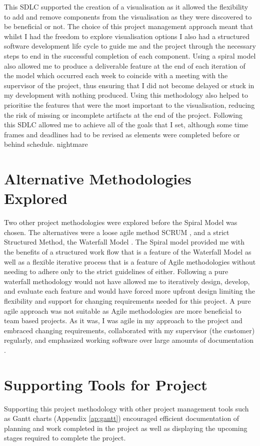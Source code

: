This SDLC supported the creation of a visualisation as
it allowed the flexibility to add and remove components from the visualisation
as they were discovered to be beneficial or not. The choice of this project management approach
meant that whilst I had the freedom to explore visualisation options I also had
a structured software development life cycle to guide me and the project through
the necessary steps to end in the successful completion of each
component.
%
Using a spiral model also allowed me to produce a deliverable feature at the end
of each iteration of the model which occurred each week to coincide with a
meeting with the supervisor of the project, thus ensuring that I did not become delayed or stuck
in my development with nothing produced. Using this methodology also
helped to prioritise the features that were the most important to the
visualisation, reducing the risk of missing or incomplete
artifacts at the end of the project. 
Following this SDLC allowed me to achieve all of the goals
that I set, although some time frames and deadlines had to be revised as elements were completed before or behind schedule. 
nightmare

\section{Alternative Methodologies Explored}
Two other project methodologies were explored before the
Spiral Model was chosen. The alternatives were a loose agile method SCRUM \cite{schwaber2004agile}, and
a strict Structured Method, the Waterfall Model \cite{royce1970managing}. 
The Spiral model provided
me with the benefits of a structured work flow that is a feature of the
Waterfall Model as
well as a flexible iterative process that is a feature of Agile methodologies
without needing to adhere only to the strict guidelines of either. Following a
pure waterfall methodology would not have allowed me to iteratively
design, develop, and evaluate each feature and would have forced more upfront
design limiting the flexibility and support for changing requirements 
needed for this project. A pure agile approach was not suitable as Agile methodologies are more
beneficial to team based projects. As it was,
I was agile in my approach to the project and embraced changing requirements,
collaborated with my supervisor (the customer) regularly, and emphasized working
software over large amounts of documentation \cite{beck2001agile}. 

\section{Supporting Tools for Project}
Supporting this project methodology with other project management tools such
as Gantt charts (Appendix \ref{ap:gantt})
encouraged efficient documentation of planning and work completed in the project
as well as displaying the upcoming stages required to complete the project.

